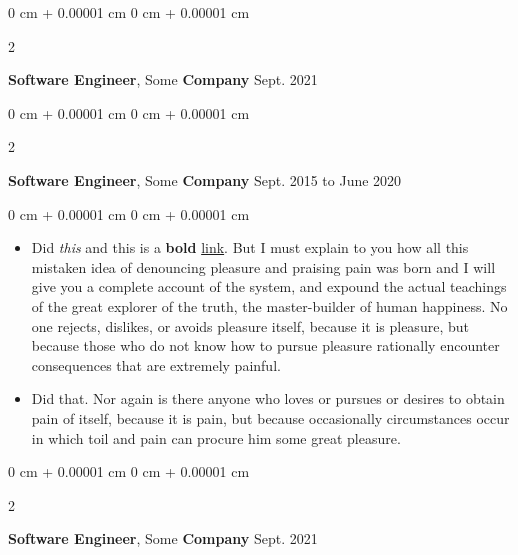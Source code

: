 \documentclass[10pt, letterpaper]{article}
\newenvironment{highlights}{
    \begin{itemize}[
        topsep=0.10 cm,
        parsep=0.10 cm,
        partopsep=0pt,
        itemsep=0pt,
        leftmargin=0 cm + 10pt
    ]
}{
    \end{itemize}
} %
\newenvironment{onecolentry}{
    \begin{adjustwidth}{
        0 cm + 0.00001 cm
    }{
        0 cm + 0.00001 cm
    }
}{
    \end{adjustwidth}
} %
\newenvironment{twocolentry}[2][]{
    \onecolentry
    \def\secondColumn{#2}
    \setcolumnwidth{\fill, 4.5 cm}
    \begin{paracol}{2}
}{
    \switchcolumn \raggedleft \secondColumn
    \end{paracol}
    \endonecolentry
} %
\begin{document}
        \vspace{0.2 cm}

        \begin{twocolentry}{
            Sept. 2021
        }
            \textbf{Software Engineer}, Some \textbf{Company}\end{twocolentry}



        \vspace{0.2 cm}

        \begin{twocolentry}{
            Sept. 2015 to June 2020
        }
            \textbf{Software Engineer}, Some \textbf{Company}\end{twocolentry}

        \vspace{0.10 cm}
        \begin{onecolentry}
            \begin{highlights}
                \item Did \textit{this} and this is a \textbf{bold} \href{https://example.com}{link}. But I must explain to you how all this mistaken idea of denouncing pleasure and praising pain was born and I will give you a complete account of the system, and expound the actual teachings of the great explorer of the truth, the master-builder of human happiness. No one rejects, dislikes, or avoids pleasure itself, because it is pleasure, but because those who do not know how to pursue pleasure rationally encounter consequences that are extremely painful.
                \item Did that. Nor again is there anyone who loves or pursues or desires to obtain pain of itself, because it is pain, but because occasionally circumstances occur in which toil and pain can procure him some great pleasure.
            \end{highlights}
        \end{onecolentry}


        \vspace{0.2 cm}

        \begin{twocolentry}{
            Sept. 2021
        }
            \textbf{Software Engineer}, Some \textbf{Company}\end{twocolentry}
\end{document}
